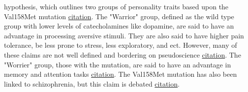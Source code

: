 \documentclass[letterpaper]{article}
\begin{document}
hypothesis, which outlines two groups of personality traits based upon
the Val158Met mutation
\href{https://pubmed.ncbi.nlm.nih.gov/17008817/}{citation}. The "Warrior"
group, defined as the wild type group with lower levels of
catecholamines like dopamine, are said to have an advantage in
processing aversive stimuli. They are also said to have higher pain
tolerance, be less prone to stress, less exploratory, and ect. However,
many of these claims are not well defined and bordering on pseudoscience
\href{https://selfdecode.com/snp/rs4680/}{citation}. The "Worrier" group,
those with the mutation, are said to have an advantage in memory and
attention tasks \href{https://pubmed.ncbi.nlm.nih.gov/17008817/}{citation}.
The Val158Met mutation has also been linked to schizophrenia, but this
claim is debated
\href{https://pubmed.ncbi.nlm.nih.gov/32931693/}{citation}.
\end{document}
